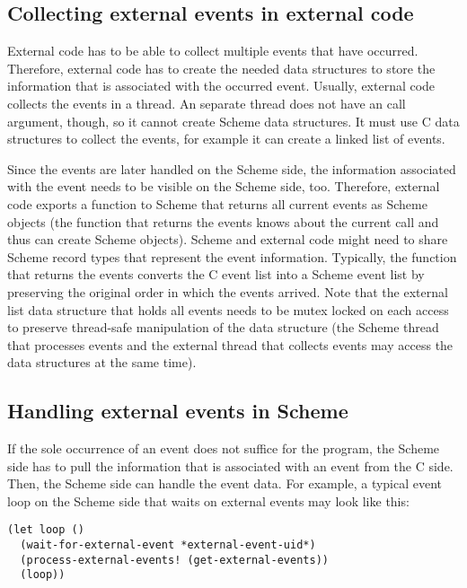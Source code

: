 \subsection{Collecting external events in external code}

External code has to be able to collect multiple events that have
occurred.  Therefore, external code has to create the needed data
structures to store the information that is associated with the
occurred event.  Usually, external code collects the events in a
thread.  An separate thread does not have an call argument, though, so
it cannot create Scheme data structures.  It must use C data
structures to collect the events, for example it can create a linked
list of events.

Since the events are later handled on the Scheme side, the information
associated with the event needs to be visible on the Scheme side, too.
Therefore, external code exports a function to Scheme that returns all
current events as Scheme objects (the function that returns the events
knows about the current call and thus can create Scheme objects).
Scheme and external code might need to share Scheme record types that
represent the event information.  Typically, the function that returns
the events converts the C event list into a Scheme event list by
preserving the original order in which the events arrived.  Note that
the external list data structure that holds all events needs to be
mutex locked on each access to preserve thread-safe manipulation of
the data structure (the Scheme thread that processes events and the
external thread that collects events may access the data structures at
the same time).

\subsection{Handling external events in Scheme}

If the sole occurrence of an event does not suffice for the program,
the Scheme side has to pull the information that is associated with an
event from the C side.  Then, the Scheme side can handle the event
data.  For example, a typical event loop on the Scheme side that waits
on external events may look like this:

\begin{verbatim}
(let loop ()
  (wait-for-external-event *external-event-uid*)
  (process-external-events! (get-external-events))
  (loop))
\end{verbatim}

